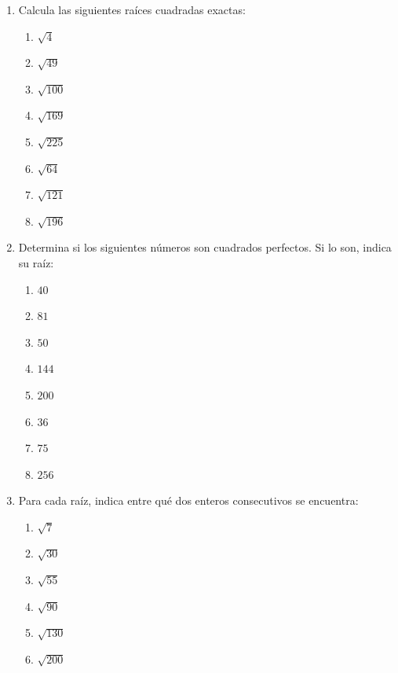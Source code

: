 \documentclass[11pt, letterpaper]{article}
\begin{document}
\begin{enumerate}[label=\textbf{\arabic*.}, leftmargin=*]
  \item Calcula las siguientes raíces cuadradas exactas:
  \begin{multicols}{4}
  \begin{enumerate}[label=\alph*)]
    \item $\sqrt{4}$
    \item $\sqrt{49}$
    \item $\sqrt{100}$
    \item $\sqrt{169}$
    \item $\sqrt{225}$
    \item $\sqrt{64}$
    \item $\sqrt{121}$
    \item $\sqrt{196}$
  \end{enumerate}
  \end{multicols}

  \item Determina si los siguientes números son cuadrados perfectos. Si lo son, indica su raíz:
  \begin{multicols}{4}
  \begin{enumerate}[label=\alph*)]
    \item $40$
    \item $81$
    \item $50$
    \item $144$
    \item $200$
    \item $36$
    \item $75$
    \item $256$
  \end{enumerate}
  \end{multicols}

  \item Para cada raíz, indica entre qué dos enteros consecutivos se encuentra:
  \begin{multicols}{3}
  \begin{enumerate}[label=\alph*)]
    \item $\sqrt{7}$
    \item $\sqrt{30}$
    \item $\sqrt{55}$
    \item $\sqrt{90}$
    \item $\sqrt{130}$
    \item $\sqrt{200}$
  \end{enumerate}
  \end{multicols}
\end{enumerate}
\end{document}
